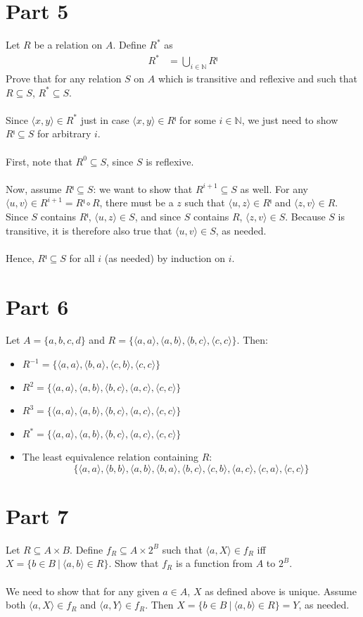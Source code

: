 \documentclass[11pt,letterpaper,twoside]{article}
\theoremstyle{definition}
\def\divd{\ |\ }
\begin{document}
\section{Part 5}
\label{sec:orgb95c1c2}
Let \(R\) be a relation on \(A\). Define \(R^*\) as
\begin{align*}
R^* &= \bigcup_{i ∈ ℕ}Rⁱ
\end{align*}
Prove that for any relation \(S\) on \(A\) which is transitive and reflexive and
such that \(R ⊆ S\), \(R^* ⊆ S\). \\
~\\
\noindent Since \(⟨x, y⟩ ∈ R^*\) just in case \(⟨x, y⟩ ∈ Rⁱ\) for some
\(i ∈ ℕ\), we just need to show \(Rⁱ ⊆ S\) for arbitrary \(i\). \\
~\\
\noindent First, note that \(R^0 ⊆ S\), since \(S\) is reflexive. \\
~\\
\noindent Now, assume \(Rⁱ ⊆ S\): we want to show that \(R^{i + 1} ⊆ S\)
as well. For any \(⟨u, v⟩ ∈ R^{i + 1} = Rⁱ ∘ R\), there must be a \(z\) such that
\(⟨u, z⟩ ∈ Rⁱ\) and \(⟨z, v⟩ ∈ R\). Since \(S\) contains \(Rⁱ\), \(⟨u, z⟩ ∈ S\), and
since \(S\) contains \(R\), \(⟨z, v⟩ ∈ S\). Because \(S\) is transitive, it is
therefore also true that \(⟨u, v⟩ ∈ S\), as needed. \\
~\\
\noindent Hence, \(Rⁱ ⊆ S\) for all \(i\) (as needed) by induction on
\(i\).

\section{Part 6}
\label{sec:orgf798ac4}
Let \(A = \{a, b, c, d\}\) and \(R = \{⟨a, a⟩, ⟨a, b⟩, ⟨b, c⟩, ⟨c, c⟩\}\). Then:
\begin{itemize}
\item \(R^{-1} = \{⟨a, a⟩, ⟨b, a⟩, ⟨c, b⟩, ⟨c, c⟩\}\)
\item \(R^2 = \{⟨a, a⟩, ⟨a, b⟩, ⟨b, c⟩, ⟨a, c⟩, ⟨c, c⟩\}\)
\item \(R^3 = \{⟨a, a⟩, ⟨a, b⟩, ⟨b, c⟩, ⟨a, c⟩, ⟨c, c⟩\}\)
\item \(R^* = \{⟨a, a⟩, ⟨a, b⟩, ⟨b, c⟩, ⟨a, c⟩, ⟨c, c⟩\}\)
\item The least equivalence relation containing \(R\):
$$\{⟨a, a⟩, ⟨b, b⟩, ⟨a, b⟩, ⟨b, a⟩, ⟨b, c⟩, ⟨c, b⟩, ⟨a, c⟩, ⟨c, a⟩, ⟨c,
    c⟩\}$$
\end{itemize}

\section{Part 7}
\label{sec:orgdc6d0a0}
Let \(R ⊆ A × B\). Define \(f_R ⊆ A × 2^B\) such that \(⟨a, X⟩ ∈ f_R\) iff \(X = \{b
  ∈ B \divd ⟨a, b⟩ ∈ R\}\). Show that \(f_R\) is a function from \(A\) to \(2^B\). \\
~\\
\noindent We need to show that for any given \(a ∈ A\), \(X\) as defined
above is unique. Assume both \(⟨a, X⟩ ∈ f_R\) and \(⟨a, Y⟩ ∈ f_R\). Then \(X = \{b
  ∈ B \divd ⟨a, b⟩ ∈ R\} = Y\), as needed.

\printbibliography
\end{document}
